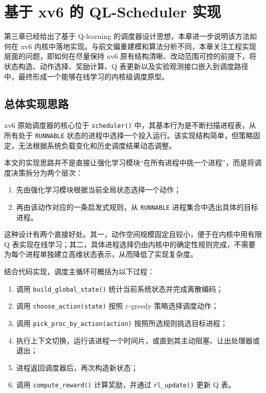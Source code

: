 \section{基于 xv6 的 QL-Scheduler 实现}

第三章已经给出了基于 Q-learning 的调度器设计思想，本章进一步说明该方法如何在 xv6 内核中落地实现。与前文偏重建模和算法分析不同，本章关注工程实现层面的问题，即如何在尽量保持 xv6 原有结构清晰、改动范围可控的前提下，将状态构造、动作选择、奖励计算、Q 表更新以及实验观测接口嵌入到调度路径中，最终形成一个能够在线学习的内核级调度原型。

\subsection{总体实现思路}

xv6 原始调度器的核心位于 \texttt{scheduler()} 中，其基本行为是不断扫描进程表，从所有处于 \texttt{RUNNABLE} 状态的进程中选择一个投入运行。该实现结构简单，但策略固定，无法根据系统负载变化和历史调度结果动态调整。

本文的实现思路并不是直接让强化学习模块“在所有进程中挑一个进程”，而是将调度决策拆分为两个层次：

\begin{enumerate}
\item 先由强化学习模块根据当前全局状态选择一个动作；
\item 再由该动作对应的一条启发式规则，从 \texttt{RUNNABLE} 进程集合中选出具体的目标进程。
\end{enumerate}

这种设计有两个直接好处。其一，动作空间规模固定且较小，便于在内核中用有限 Q 表实现在线学习；其二，具体进程选择仍由内核中的确定性规则完成，不需要为每个进程单独建立高维状态表示，从而降低了实现复杂度。

结合代码实现，调度主循环可概括为以下过程：

\begin{enumerate}
\item 调用 \texttt{build\_global\_state()} 统计当前系统状态并完成离散编码；
\item 调用 \texttt{choose\_action(state)} 按照 $\varepsilon$-greedy 策略选择调度动作；
\item 调用 \texttt{pick\_proc\_by\_action(action)} 按照所选规则挑选目标进程；
\item 执行上下文切换，运行该进程一个时间片，或直到其主动阻塞、让出处理器或退出；
\item 进程返回调度器后，再次构造新状态；
\item 调用 \texttt{compute\_reward()} 计算奖励，并通过 \texttt{rl\_update()} 更新 Q 表。
\end{enumerate}

